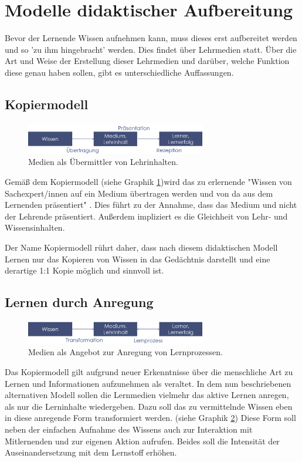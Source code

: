 \section{Modelle didaktischer Aufbereitung}
\label{sec:Lernmodelle}
Bevor der Lernende Wissen aufnehmen kann, muss dieses erst aufbereitet werden und so 'zu ihm hingebracht' werden. Dies findet über Lehrmedien statt. Über die Art und Weise der Erstellung dieser Lehrmedien und darüber, welche Funktion diese genau haben sollen, gibt es unterschiedliche Auffassungen.

\subsection{Kopiermodell}
\label{sub:Kopiermodell}
\begin{figure}[h]
	\centering
	\includegraphics[width=0.7\textwidth]{Abbildungen/Kopiermodell.PNG}
	\caption{Medien als Übermittler von Lehrinhalten. \cite[S. 146]{Kerres.2001}}
	\label{fig:Kerres2001_Kopiermodell}
\end{figure}
Gemäß dem Kopiermodell (siehe Graphik \ref{fig:Kerres2001_Kopiermodell})wird das zu erlernende "Wissen von Sachexpert/innen auf ein Medium übertragen werden und von da aus dem Lernenden präsentiert" \cite[S. 146]{Kerres.2001}. Dies führt zu der Annahme, dass das Medium und nicht der Lehrende präsentiert. Außerdem impliziert es die Gleichheit von Lehr- und Wissensinhalten.

Der Name Kopiermodell rührt daher, dass nach diesem didaktischen Modell Lernen nur das Kopieren von Wissen in das Gedächtnis darstellt und eine derartige 1:1 Kopie möglich und sinnvoll ist. \cite[S. 145 - 146]{Kerres.2001}

\subsection{Lernen durch Anregung}
\label{sub:LernenDurchAnregung}
\begin{figure}[h]
	\centering
	\includegraphics[width=0.7\textwidth]{Abbildungen/Anregungsmodell.PNG}
	\caption{Medien als Angebot zur Anregung von Lernprozessen. \cite[S. 147]{Kerres.2001}}
	\label{fig:Kerres2001_LernenDurchAnregung}
\end{figure}
Das Kopiermodell gilt aufgrund neuer Erkenntnisse über die menschliche Art zu Lernen und Informationen aufzunehmen als veraltet.
In dem nun beschriebenen alternativen Modell sollen die Lernmedien vielmehr das aktive Lernen anregen, als nur die Lerninhalte wiedergeben. 
Dazu soll das zu vermittelnde Wissen eben in diese anregende Form transformiert werden. (siehe Graphik \ref{fig:Kerres2001_LernenDurchAnregung}) Diese Form soll neben der einfachen Aufnahme des Wissens auch zur Interaktion mit Mitlernenden und zur eigenen Aktion aufrufen. Beides soll die Intensität der Auseinandersetzung mit dem Lernstoff erhöhen. \cite[S. 147 - 148]{Kerres.2001}